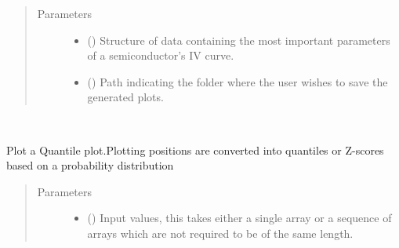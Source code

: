 \documentclass[letterpaper,10pt,english,openany, oneside]{sphinxmanual}
\begin{document}
\begin{fulllineitems}
\begin{fulllineitems}
\begin{fulllineitems}
\end{fulllineitems}

\begin{quote}\begin{description}
\item[{Parameters}] \leavevmode\begin{itemize}
\item {} 
 () \textendash{} Structure of data containing the most important parameters of a semiconductor’s IV curve.

\item {} 
 (\sphinxstyleliteralemphasis{\sphinxupquote{, }}) \textendash{} Path indicating the folder where the user wishes to save the generated plots.

\end{itemize}

\end{description}\end{quote}

\end{fulllineitems}


\begin{fulllineitems}
\label{\detokenize{index:fompy.plots.plotter.qq}}~

\begin{fulllineitems}
Plot a Quantile plot.Plotting positions are converted into quantiles
or Z-scores based on a probability distribution

\end{fulllineitems}

\begin{quote}\begin{description}
\item[{Parameters}] \leavevmode\begin{itemize}
\item {} 
 (\sphinxstyleliteralemphasis{\sphinxupquote{, }}\sphinxstyleliteralemphasis{\sphinxupquote{ (}}\sphinxstyleliteralemphasis{\sphinxupquote{,}}\sphinxstyleliteralemphasis{\sphinxupquote{)}}) \textendash{} Input values, this takes either a single array or a sequence of arrays
which are not required to be of the same length.


\end{itemize}
\end{description}
\end{quote}
\end{fulllineitems}
\end{fulllineitems}
\end{document}
